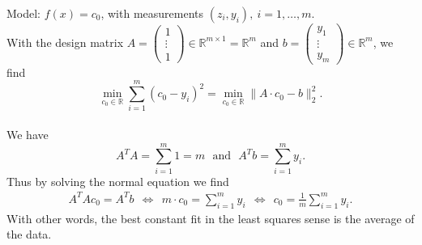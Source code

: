 {\color{solution}
Model: $f(x)=c_0$, with measurements $(z_i,y_i),~i=1,\dots,m$.\\
With the design matrix $A=\begin{pmatrix}1\\\vdots\\1\end{pmatrix}\in\mathbb{R}^{m\times 1}=\mathbb{R}^m$ and $b = \begin{pmatrix}y_1\\\vdots\\y_m\end{pmatrix}\in\mathbb{R}^m$, we find
$$\min_{c_0\in\mathbb{R}}\sum_{i=1}^{m}(c_0-y_i)^2=\min_{c_0\in\mathbb{R}}\|A\cdot c_0-b\|_2^2.$$\\
We have
$$
A^TA=\sum_{i=1}^{m}1=m ~~~\text{and}~~~A^Tb =\sum_{i=1}^{m}y_i.
$$ 
Thus by solving the normal equation we find
\begin{align*}
A^TAc_0=A^Tb~~\Leftrightarrow~~m\cdot c_0=\sum_{i=1}^{m}y_i
~~\Leftrightarrow~~c_0=\frac{1}{m}\sum_{i=1}^{m}y_i.
\end{align*}
With other words, the best constant fit in the least squares sense is the average of the data.
}